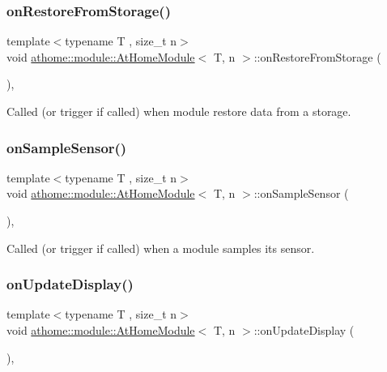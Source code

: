 \subsubsection{\texorpdfstring{on\+Restore\+From\+Storage()}{onRestoreFromStorage()}}
{\footnotesize\ttfamily template$<$typename T , size\+\_\+t n$>$ \\
void \mbox{\hyperlink{classathome_1_1module_1_1_at_home_module}{athome\+::module\+::\+At\+Home\+Module}}$<$ T, n $>$\+::on\+Restore\+From\+Storage (\begin{DoxyParamCaption}{ }\end{DoxyParamCaption})\hspace{0.3cm}{\ttfamily [inline]}, {\ttfamily [protected]}}

Called (or trigger if called) when module restore data from a storage. \mbox{\label{classathome_1_1module_1_1_at_home_module_a0c78d6ba7b9784d1a895bd9f109bd048}} 
\subsubsection{\texorpdfstring{on\+Sample\+Sensor()}{onSampleSensor()}}
{\footnotesize\ttfamily template$<$typename T , size\+\_\+t n$>$ \\
void \mbox{\hyperlink{classathome_1_1module_1_1_at_home_module}{athome\+::module\+::\+At\+Home\+Module}}$<$ T, n $>$\+::on\+Sample\+Sensor (\begin{DoxyParamCaption}{ }\end{DoxyParamCaption})\hspace{0.3cm}{\ttfamily [inline]}, {\ttfamily [protected]}}

Called (or trigger if called) when a module samples its sensor. \mbox{\label{classathome_1_1module_1_1_at_home_module_a78fdbc14589f82531bd08baeb2e3cfb1}} 
\subsubsection{\texorpdfstring{on\+Update\+Display()}{onUpdateDisplay()}}
{\footnotesize\ttfamily template$<$typename T , size\+\_\+t n$>$ \\
void \mbox{\hyperlink{classathome_1_1module_1_1_at_home_module}{athome\+::module\+::\+At\+Home\+Module}}$<$ T, n $>$\+::on\+Update\+Display (\begin{DoxyParamCaption}{ }\end{DoxyParamCaption})\hspace{0.3cm}{\ttfamily [inline]}, {\ttfamily [protected]}}

